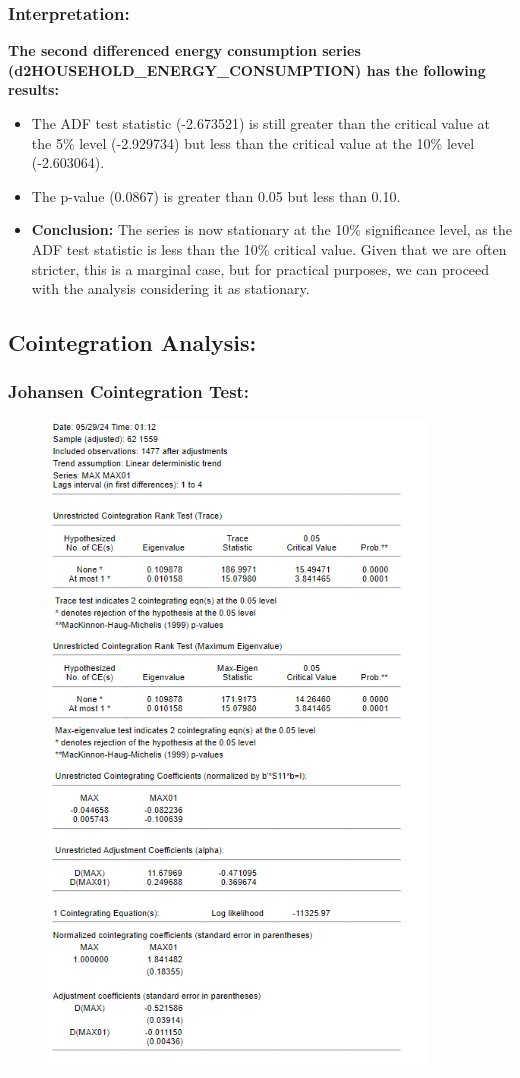 \documentclass{article} %
\begin{document}
\subsubsection*{Interpretation:}
\textbf{The second differenced energy consumption series (d2HOUSEHOLD\_ENERGY\_CONSUMPTION) has the following results:}
\begin{itemize}
    \item The ADF test statistic (-2.673521) is still greater than the critical value at the 5\% level (-2.929734) but less than the critical value at the 10\% level (-2.603064).
    \item The p-value (0.0867) is greater than 0.05 but less than 0.10.
    \item \textbf{Conclusion:} The series is now stationary at the 10\% significance level, as the ADF test statistic is less than the 10\% critical value. Given that we are often stricter, this is a marginal case, but for practical purposes, we can proceed with the analysis considering it as stationary.
\end{itemize}

\subsection{Cointegration Analysis:}
\subsubsection*{Johansen Cointegration Test:}

\begin{figure}[H]
    \centering
    \includegraphics[width=10cm]{images/image1.png}
\end{figure}
\end{document}
